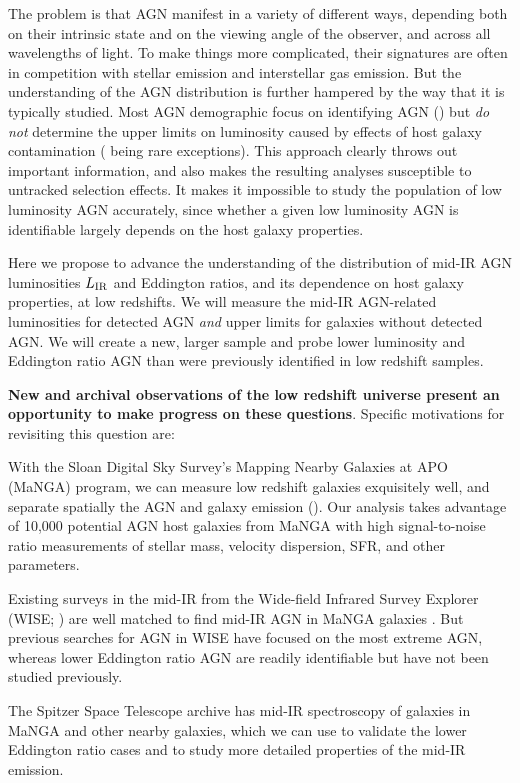 \documentclass[12pt, preprint]{hacked-aastex}
\newlength{\mylen}
\newenvironment{ditemize}
{ \begin{list}{}{%
\setlength{\topsep}{0pt}%
\setlength{\partopsep}{3pt}%
\setlength{\itemsep}{1pt}\setlength{\parsep}{1pt}%
\setlength{\itemindent}{0pt}\setlength{\listparindent}{12pt}%
\setlength{\leftmargin}{24pt}\setlength{\rightmargin}{0in}%
\setlength{\labelsep}{3pt}\setlength{\labelwidth}{6pt}%
\setlength{\mylen}{3pt}
\renewcommand{\makelabel}{\makebox[\labelwidth][l]{\raisebox{\mylen}{\tiny$\bullet$}\hspace{\fill}}}}}
{\end{list}}
\begin{document}
The problem is that AGN manifest in a variety of different ways,
depending both on their intrinsic state and on the viewing angle of
the observer, and across all wavelengths of light.  To make things
more complicated, their signatures are often in competition with
stellar emission and interstellar gas emission.  But the understanding
of the AGN distribution is further hampered by the way that it is
typically studied. Most AGN demographic focus on identifying AGN
(\cite{kauffmann03b, lacy15a, sanchez19a, comerford20a, greene20a})
but {\it do not} determine the upper limits on luminosity caused by
effects of host galaxy contamination (\cite{trump15a, jones17a} being
rare exceptions). This approach clearly throws out important
information, and also makes the resulting analyses susceptible to
untracked selection effects. It makes it impossible to study the
population of low luminosity AGN accurately, since whether a given low
luminosity AGN is identifiable largely depends on the host galaxy
properties.

Here we propose to advance the understanding of the distribution of
mid-IR AGN luminosities $L_{\rm IR}$ and Eddington ratios, and its
dependence on host galaxy properties, at low redshifts.  We will
measure the mid-IR AGN-related luminosities for detected AGN {\it and}
upper limits for galaxies without detected AGN. We will create a new,
larger sample and probe lower luminosity and Eddington ratio AGN than
were previously identified in low redshift samples.

{\bf New and archival observations of the low redshift universe
  present an opportunity to make progress on these
  questions}. Specific motivations for revisiting this question are:
\begin{ditemize}
\item With the Sloan Digital Sky Survey's Mapping Nearby Galaxies at
  APO (MaNGA) program, we can measure low redshift galaxies
  exquisitely well, and separate spatially the AGN and galaxy emission
  (\cite{bundy15a, blanton17a}).  Our analysis takes advantage of
  10,000 potential AGN host galaxies from MaNGA with high
  signal-to-noise ratio measurements of stellar mass, velocity
  dispersion, SFR, and other parameters.
\item Existing surveys in the mid-IR from the Wide-field Infrared
  Survey Explorer (WISE; \cite{wright10a}) are well matched to find
  mid-IR AGN in MaNGA galaxies \cite{comerford20a}. But previous
  searches for AGN in WISE have focused on the most extreme AGN,
  whereas lower Eddington ratio AGN are readily identifiable but have
  not been studied previously.
\item The Spitzer Space Telescope archive has mid-IR spectroscopy of
  galaxies in MaNGA and other nearby galaxies, which we can use to
  validate the lower Eddington ratio cases and to study more detailed
  properties of the mid-IR emission.
\end{ditemize}
\end{document}
